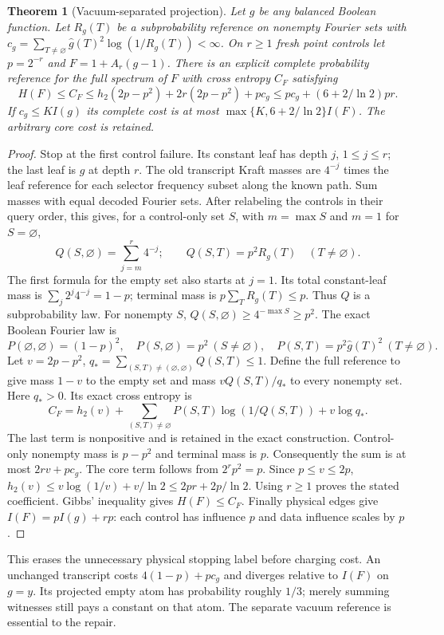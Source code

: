 \documentclass{article}
\newtheorem{theorem}{Theorem}
\begin{document}
\begin{theorem}[Vacuum-separated projection]
Let $g$ be any balanced Boolean function. Let $R_g(T)$ be a subprobability
reference on nonempty Fourier sets with
$c_g=\sum_{T\ne\varnothing}\widehat g(T)^2\log(1/R_g(T))<\infty$.
On $r\ge1$ fresh point controls let $p=2^{-r}$ and
$F=1+A_r(g-1)$. There is an explicit complete probability reference for
the full spectrum of $F$ with cross entropy $C_F$ satisfying
\[
 H(F)\le C_F\le h_2(2p-p^2)+2r(2p-p^2)+pc_g
              \le p c_g+(6+2/\ln2)pr.
\]
If $c_g\le K I(g)$ its complete cost is at most
$\max\{K,6+2/\ln2\}I(F)$. The arbitrary core cost is retained.
\end{theorem}
\begin{proof}
Stop at the first control failure. Its constant leaf has depth $j$,
$1\le j\le r$; the last leaf is $g$ at depth $r$. The old transcript
Kraft masses are $4^{-j}$ times the leaf reference for each selector
frequency subset along the known path. Sum masses with equal decoded
Fourier sets. After relabeling the controls in their query order, this
gives, for a control-only set $S$, with $m=\max S$ and $m=1$ for
$S=\varnothing$,
\[
 Q(S,\varnothing)=\sum_{j=m}^r4^{-j};\qquad
 Q(S,T)=p^2R_g(T)\quad(T\ne\varnothing).
\]
The first formula for the empty set also starts at $j=1$.
Its total constant-leaf mass is $\sum_j2^j4^{-j}=1-p$; terminal
mass is $p\sum_TR_g(T)\le p$. Thus $Q$ is a subprobability law.
For nonempty $S$, $Q(S,\varnothing)\ge4^{-\max S}\ge p^2$.
The exact Boolean Fourier law is
\[
 P(\varnothing,\varnothing)=(1-p)^2,\quad
 P(S,\varnothing)=p^2\ (S\ne\varnothing),\quad
 P(S,T)=p^2\widehat g(T)^2\ (T\ne\varnothing).
\]
Let $v=2p-p^2$, $q_*=\sum_{(S,T)\ne(\varnothing,\varnothing)}Q(S,T)
\le1$. Define the full reference to give mass $1-v$ to the empty
set and mass $vQ(S,T)/q_*$ to every nonempty set. Here $q_*>0$.
Its exact cross entropy is
\[
 C_F=h_2(v)+\sum_{(S,T)\ne\varnothing}P(S,T)
                         \log(1/Q(S,T))+v\log q_*.
\]
The last term is nonpositive and is retained in the exact construction.
Control-only nonempty mass is $p-p^2$ and terminal mass is $p$.
Consequently the sum is at most $2rv+pc_g$. The core term follows
from $2^rp^2=p$. Since $p\le v\le2p$,
$h_2(v)\le v\log(1/v)+v/\ln2\le2pr+2p/\ln2$.
Using $r\ge1$ proves the stated coefficient. Gibbs' inequality gives
$H(F)\le C_F$. Finally physical edges give $I(F)=pI(g)+rp$:
each control has influence $p$ and data influence scales by $p$.
\end{proof}
This erases the unnecessary physical stopping label before charging
cost. An unchanged transcript costs $4(1-p)+pc_g$ and diverges relative
to $I(F)$ on $g=y$. Its projected empty atom has probability roughly
$1/3$; merely summing witnesses still pays a constant on that atom.
The separate vacuum reference is essential to the repair.
\end{document}
